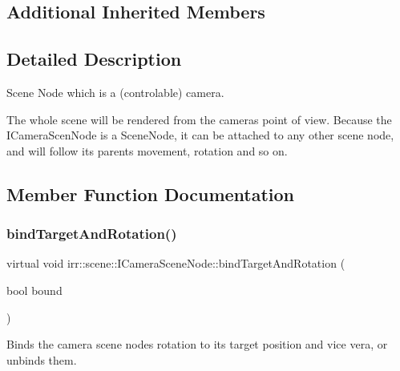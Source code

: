 \subsection*{Additional Inherited Members}


\subsection{Detailed Description}
Scene Node which is a (controlable) camera. 

The whole scene will be rendered from the cameras point of view. Because the I\+Camera\+Scen\+Node is a Scene\+Node, it can be attached to any other scene node, and will follow its parents movement, rotation and so on. 

\subsection{Member Function Documentation}
\mbox{\label{classirr_1_1scene_1_1ICameraSceneNode_ad8785d7b2f730933a8d4425ac54e7205}} 
\subsubsection{\texorpdfstring{bind\+Target\+And\+Rotation()}{bindTargetAndRotation()}\hspace{0.1cm}{\footnotesize\ttfamily [1/2]}}
{\footnotesize\ttfamily virtual void irr\+::scene\+::\+I\+Camera\+Scene\+Node\+::bind\+Target\+And\+Rotation (\begin{DoxyParamCaption}\item[{bool}]{bound }\end{DoxyParamCaption})\hspace{0.3cm}{\ttfamily [pure virtual]}}



Binds the camera scene node\textquotesingle{}s rotation to its target position and vice vera, or unbinds them. 

